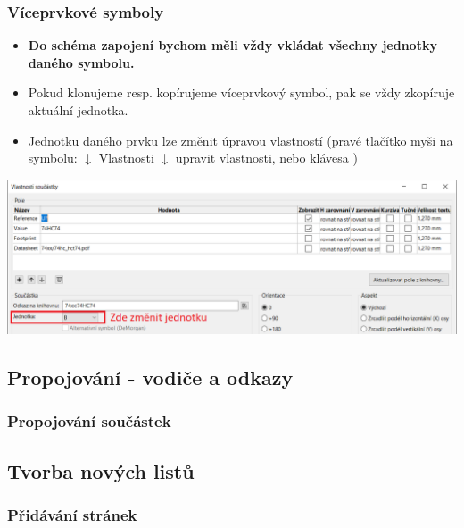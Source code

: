 \documentclass{beamer}
\begin{document}
\begin{frame}
	\frametitle{Víceprvkové symboly}
	\small
	\begin{itemize}
		\item \textbf{Do schéma zapojení bychom měli vždy vkládat všechny jednotky daného symbolu.}
		\item Pokud klonujeme resp. kopírujeme víceprvkový symbol, pak se vždy zkopíruje aktuální jednotka.
		\item Jednotku daného prvku lze změnit úpravou vlastností (pravé tlačítko myši na symbolu: $\downarrow$ Vlastnosti $\downarrow$ upravit vlastnosti, nebo klávesa )
	\end{itemize}
	
	\begin{center}
		\includegraphics[width=\textwidth]{obr/umisti_soucastku04.png}
	\end{center}
	
\end{frame}


\subsection{\texorpdfstring{Propojování - vodiče a odkazy}{Propojovani - vodice a odkazy}}
\begin{frame}
	\frametitle{Propojování součástek}
		
\end{frame}


\subsection{\texorpdfstring{Tvorba nových listů}{Tvorba novych listu}}
\begin{frame}
	\frametitle{Přidávání stránek}
		
\end{frame}
\end{document}
